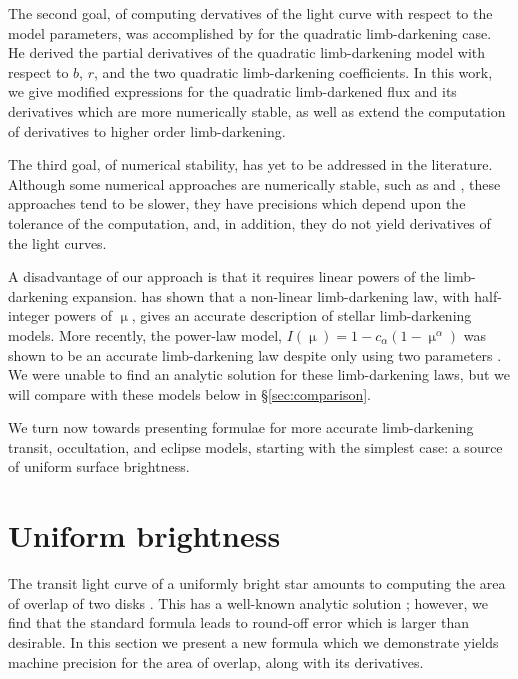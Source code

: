 \documentclass[modern]{aastex61}
\begin{document}
The second goal, of computing dervatives of the light curve with respect to
the model parameters, was accomplished by \cite{Pal2008} for the quadratic
limb-darkening case.  He derived the partial derivatives of the quadratic 
limb-darkening model with respect to $b$, $r$, and the two quadratic 
limb-darkening coefficients.  In this work, we give modified expressions 
for the quadratic limb-darkened flux and its derivatives which are 
more numerically stable, as well as extend the computation of derivatives
to higher order limb-darkening.

The third goal, of numerical stability, has yet to be addressed in the literature.
Although some numerical approaches are numerically stable, such as \cite{Gimenez2006} 
and \cite{Kreidberg2015}, these approaches tend to be slower, they have precisions
which depend upon the tolerance of the computation, and, in addition, they do not 
yield derivatives of the light curves.

A disadvantage of our approach is that it requires linear powers of the limb-darkening
expansion.  \citet{Claret2000} has shown that a non-linear limb-darkening law,
with half-integer powers of $\upmu$, gives an accurate description of stellar
limb-darkening models.  More recently, the power-law model, $I(\upmu) = 1-
c_\alpha(1-\upmu^\alpha)$ \citep{Hestroffer1997} was shown to be an accurate 
limb-darkening law despite only using two parameters \citep{Maxted2018,
Morello2017}.  We were unable to find an analytic solution for these limb-darkening
laws, but we will compare with these models below in \S \ref{sec:comparison}.

We turn now towards presenting formulae for more accurate limb-darkening transit,
occultation, and eclipse models, starting with the simplest case:  a source
of uniform surface brightness.


%

\section{Uniform brightness}\label{sec:uniform}

The transit light curve of a uniformly bright star amounts to computing the
area of overlap of two disks \citep{MandelAgol2002}.  This has a well-known
analytic solution \citep[e.g.][]{Weisstein2018};  however, we find that the 
standard formula leads to round-off error which is larger than desirable.  In 
this section we present a new formula which we demonstrate yields machine precision 
for the area of overlap, along with its derivatives.
\end{document}
